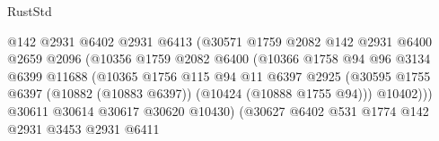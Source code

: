 \begin{lexlean}{RustStd}
\begin{coremodule}
                                        @142
                                        @2931
                                        @6402
                                        @2931
                                        @6413
                                        (@30571
                                          @1759
                                          @2082
                                          @142
                                          @2931
                                          @6400
                                          @2659
                                          @2096
                                          (@10356
                                            @1759
                                            @2082
                                            @6400
                                            (@10366
                                              @1758
                                              @94
                                              @96
                                              @3134
                                              @6399
                                              @11688
                                              (@10365
                                                @1756
                                                @115
                                                @94
                                                @11
                                                @6397
                                                @2925
                                                (@30595
                                                  @1755
                                                  @6397
                                                  (@10882 (@10883 @6397))
                                                  (@10424 (@10888 @1755 @94)))
                                                @10402)))
                                          @30611
                                          @30614
                                          @30617
                                          @30620
                                          @10430)
                                        (@30627
                                          @6402
                                          @531
                                          @1774
                                          @142
                                          @2931
                                          @3453
                                          @2931
                                          @6411

\end{coremodule}
\end{lexlean}
